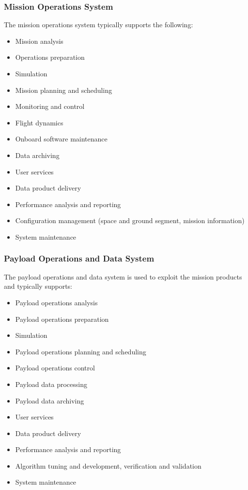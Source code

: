 \subsubsection{Mission Operations System}

The mission operations system typically supports the following:

\begin{itemize}
\item Mission analysis
\item Operations preparation
\item Simulation
\item Mission planning and scheduling
\item Monitoring and control
\item Flight dynamics
\item Onboard software maintenance
\item Data archiving
\item User services
\item Data product delivery
\item Performance analysis and reporting
\item Configuration management (space and ground segment, mission information)
\item System maintenance
\end{itemize}

\subsubsection{Payload Operations and Data System}

The payload operations and data system is used to exploit the mission products and typically supports:

\begin{itemize}
\item Payload operations analysis
\item Payload operations preparation
\item Simulation
\item Payload operations planning and scheduling
\item Payload operations control
\item Payload data processing
\item Payload data archiving
\item User services
\item Data product delivery
\item Performance analysis and reporting
\item Algorithm tuning and development, verification and validation
\item System maintenance
\end{itemize}

